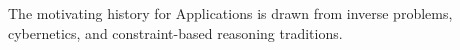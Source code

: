 The motivating history for Applications is drawn from inverse problems, cybernetics, and constraint-based reasoning traditions.
